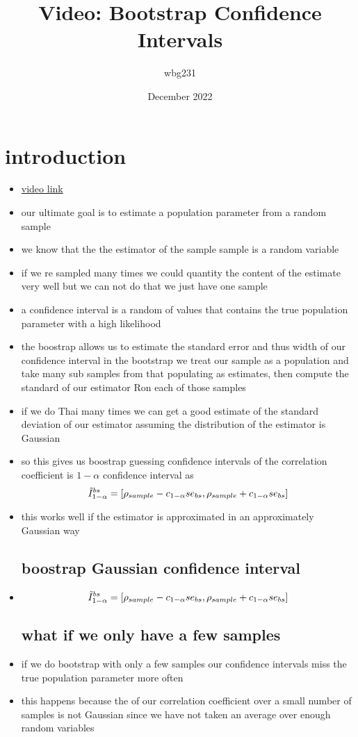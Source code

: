 \documentclass{article}
\title{Video: Bootstrap Confidence Intervals}
\author{wbg231 }
\date{December 2022}
\begin{document}
\maketitle

\section*{introduction}
\begin{itemize}
\item \href{https://www.youtube.com/watch?v=81ehHDB1Owo&list=PLBEf5mJtE6KuZ5NBQMuWIMsiOOrV9ibzm&index=76}{video link}
\item our ultimate goal is to estimate a population parameter from a random sample
\item we know that the the estimator of the sample sample is a random variable
\item if we re sampled many times we could quantity  the content of the estimate very well but we can not do that we just have one sample
\item a confidence interval is a random of values that contains the true population parameter with a high likelihood
\item the boostrap allows us to estimate the standard error and thus width of our confidence interval
\itme in the bootstrap we treat our sample as a population and take many sub samples from that populating as estimates, then compute the standard of our estimator Ron each of those samples
\item if we do Thai many times we can get a good estimate of the standard deviation of our estimator assuming the distribution of the estimator is Gaussian 
\item so this gives us boostrap guessing confidence intervals of the correlation coefficient is $1-\alpha$ confidence interval  as $$\Tilde{I}_{1-\alpha}^{bs}=[\rho_{sample}-c_{1-\alpha}se_{bs},\rho_{sample}+c_{1-\alpha}se_{bs}]$$
\item this works well if the estimator is approximated in an approximately Gaussian way 
\subsection{boostrap Gaussian confidence interval}
\item 
$$\Tilde{I}_{1-\alpha}^{bs}=[\rho_{sample}-c_{1-\alpha}se_{bs},\rho_{sample}+c_{1-\alpha}se_{bs}]$$
\subsection{what if we only have a few samples}
\item if we do bootstrap with only a few samples our confidence intervals miss the true population parameter more often
\item this happens because the  of our correlation coefficient over a small number of samples is not Gaussian since we have not taken an average over enough random variables 

\end{itemize}
\end{document}
